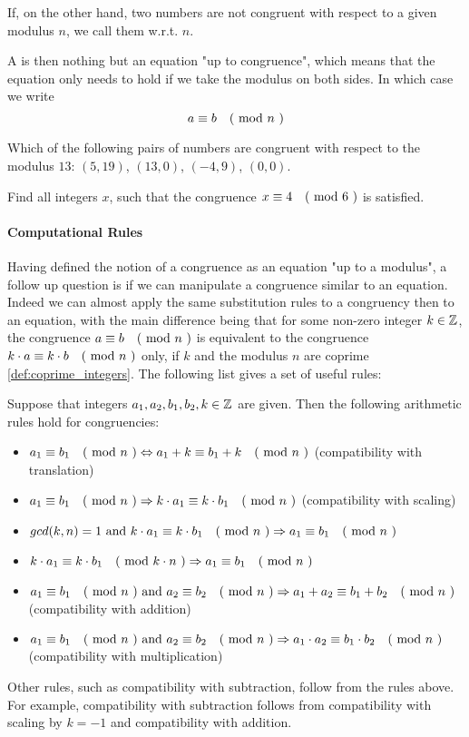 If, on the other hand, two numbers are not congruent with respect to a given modulus $n$, we call them  w.r.t. $n$.

A  is then nothing but an equation "up to congruence", which means that the equation only needs to hold if we take the modulus on both sides. In which case we write
\begin{equation}
a \equiv b \quad \text{( mod } n \text{ )}
\end{equation}
\begin{exercise}
Which of the following pairs of numbers are congruent with respect to the modulus $13$:
$(5,19)$, $(13,0)$, $(-4,9)$, $(0,0)$.
\end{exercise}
\begin{exercise}
Find all integers $x$, such that the congruence $x \equiv 4 \quad \text{( mod } 6 \text{ )}$ is satisfied.
\end{exercise}
\paragraph{Computational Rules} Having defined the notion of a congruence as an equation "up to a modulus", a follow up question is if we can manipulate a congruence similar to an equation. Indeed we can almost apply the same substitution rules to a congruency then to an equation, with the main difference being that for some non-zero integer $k\in \mathbb{Z}$, the congruence $a \equiv b \quad \text{( mod } n \text{ )}$ is equivalent to the congruence $k\cdot a \equiv k\cdot b \quad \text{( mod } n \text{ )}$ only, if $k$ and the modulus $n$ are coprime \ref{def:coprime_integers}. The following list gives a set of useful rules:

Suppose that integers $a_1,a_2,b_1,b_2, k\in\mathbb{Z}$ are given. Then the following arithmetic rules hold for congruencies:
\begin{itemize}
\label{def:modular_arithmetic_rules}
\item $a_1 \equiv b_1 \quad \text{( mod } n \text{ )}\Leftrightarrow a_1+k \equiv b_1+k \quad \text{( mod } n \text{ )}$ (compatibility with translation)
\item $a_1 \equiv b_1 \quad \text{( mod } n \text{ )}\Rightarrow k\cdot a_1 \equiv k\cdot b_1 \quad \text{( mod } n \text{ )}$ (compatibility with scaling)
\item $gcd(k,n)=1 \text{ and } k\cdot a_1 \equiv k\cdot b_1 \quad \text{( mod } n \text{ )}\Rightarrow a_1 \equiv b_1 \quad \text{( mod } n \text{ )}$
\item $k\cdot a_1 \equiv k\cdot b_1 \quad \text{( mod } k\cdot n \text{ )}\Rightarrow a_1 \equiv b_1 \quad \text{( mod } n \text{ )}$
\item $a_1 \equiv b_1 \quad \text{( mod } n \text{ )}\text{ and } a_2 \equiv b_2 \quad \text{( mod } n \text{ )}\Rightarrow a_1+a_2 \equiv b_1+b_2 \quad \text{( mod } n \text{ )}$ (compatibility with addition)
\item $a_1 \equiv b_1 \quad \text{( mod } n \text{ )}\text{ and } a_2 \equiv b_2 \quad \text{( mod } n \text{ )}\Rightarrow a_1\cdot a_2 \equiv b_1\cdot b_2 \quad \text{( mod } n \text{ )}$ (compatibility with multiplication)
\end{itemize}
Other rules, such as compatibility with subtraction, follow from the rules above. For example, compatibility with subtraction follows from compatibility with scaling by $k=-1$ and compatibility with addition.

